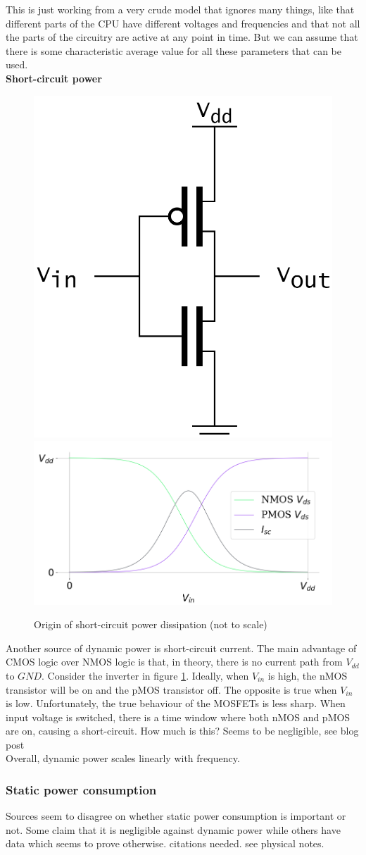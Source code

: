 \documentclass[12pt,a4paper]{article}
\newcommand{\note}{\textcolor{WildStrawberry}}
\begin{document}
This is just working from a very crude model that ignores many things, like that different parts of the CPU have different voltages and frequencies and that not all the parts of the circuitry are active at any point in time. But we can assume that there is some characteristic average value for all these parameters that can be used.\\

\textbf{Short-circuit power}\\
\begin{figure}[!h]
	\centering
	\includegraphics[width=.27\textwidth]{Source/Inverter.png}%
	\includegraphics[width=.63\textwidth]{Source/ShortCircuitCurrent.png}%
	\caption{Origin of short-circuit power dissipation (not to scale)}
	\label{Isc}
\end{figure}%
Another source of dynamic power is short-circuit current. The main advantage of CMOS logic over NMOS logic is that, in theory, there is no current path from $V_{dd}$ to $GND$. Consider the inverter in figure \ref{Isc}. Ideally, when $V_{in}$ is high, the nMOS transistor will be on and the pMOS transistor off. The opposite is true when $V_{in}$ is low. Unfortunately, the true behaviour of the MOSFETs is less sharp. When input voltage is switched, there is a time window where both nMOS and pMOS are on, causing a short-circuit.
\note{How much is this? Seems to be negligible, see blog post}\\

Overall, dynamic power scales linearly with frequency.

\subsubsection{Static power consumption}
Sources seem to disagree on whether static power consumption is important or not. Some claim that it is negligible against dynamic power while others have data which seems to prove otherwise. \note{citations needed. see physical notes}.\\
\end{document}
